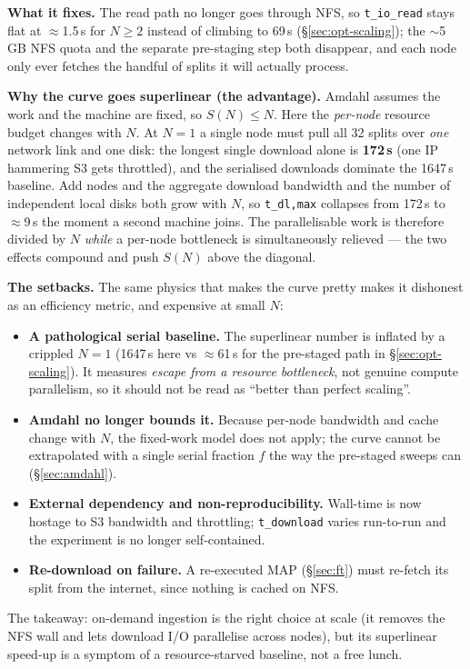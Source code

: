 \documentclass[11pt,a4paper]{article}
\newcommand{\code}[1]{\texttt{\small #1}}
\begin{document}
\textbf{What it fixes.} The read path no longer goes through NFS, so
\code{t\_io\_read} stays flat at $\approx$1.5\,s for $N\ge2$ instead of climbing
to 69\,s (\S\ref{sec:opt-scaling}); the $\sim$5\,GB NFS quota and the separate
pre-staging step both disappear, and each node only ever fetches the handful of
splits it will actually process.

\textbf{Why the curve goes superlinear (the advantage).} Amdahl assumes the work
and the machine are fixed, so $S(N)\le N$. Here the \emph{per-node} resource
budget changes with $N$. At $N{=}1$ a single node must pull all 32 splits over
\emph{one} network link and one disk: the longest single download alone is
\textbf{172\,s} (one IP hammering S3 gets throttled), and the serialised
downloads dominate the 1647\,s baseline. Add nodes and the aggregate download
bandwidth and the number of independent local disks both grow with $N$, so
\code{t\_dl,max} collapses from 172\,s to $\approx$9\,s the moment a second
machine joins. The parallelisable work is therefore divided by $N$ \emph{while}
a per-node bottleneck is simultaneously relieved --- the two effects compound and
push $S(N)$ above the diagonal.

\textbf{The setbacks.} The same physics that makes the curve pretty makes it
dishonest as an efficiency metric, and expensive at small $N$:
\begin{itemize}
\item \textbf{A pathological serial baseline.} The superlinear number is inflated
by a crippled $N{=}1$ (1647\,s here vs $\approx$61\,s for the pre-staged path in
\S\ref{sec:opt-scaling}). It measures \emph{escape from a resource bottleneck},
not genuine compute parallelism, so it should not be read as ``better than
perfect scaling''.
\item \textbf{Amdahl no longer bounds it.} Because per-node bandwidth and cache
change with $N$, the fixed-work model does not apply; the curve cannot be
extrapolated with a single serial fraction $f$ the way the pre-staged sweeps can
(\S\ref{sec:amdahl}).
\item \textbf{External dependency and non-reproducibility.} Wall-time is now
hostage to S3 bandwidth and throttling; \code{t\_download} varies run-to-run and
the experiment is no longer self-contained.
\item \textbf{Re-download on failure.} A re-executed MAP (\S\ref{sec:ft}) must
re-fetch its split from the internet, since nothing is cached on NFS.
\end{itemize}
The takeaway: on-demand ingestion is the right choice at scale (it removes the
NFS wall and lets download I/O parallelise across nodes), but its superlinear
speed-up is a symptom of a resource-starved baseline, not a free lunch.
\end{document}
